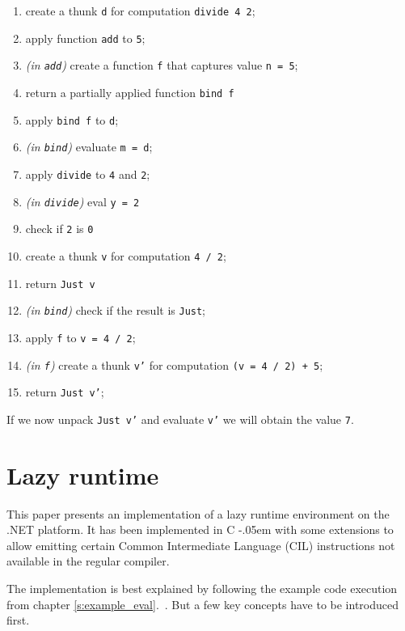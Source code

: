 \documentclass[en]{pracamgr}
\newcommand{\shrp}{%
  {\settoheight{\dimen0}{C}\kern-.05em \resizebox{!}{\dimen0}{\raisebox{\depth}{\textbf{\#}}}\hspace{1ex}}}
\newcommand{\myref}[1]{\ref{#1}.~\nameref{#1}}
\begin{document}
\begin{enumerate}
    \item create a thunk \texttt{d} for computation \texttt{divide 4 2};
    \item apply function \texttt{add} to \texttt{5};
    \item \textit{(in \texttt{add})} create a function \texttt{f} that captures value \texttt{n = 5};
    \item return a partially applied function \texttt{bind f}
    \item apply \texttt{bind f} to \texttt{d};
    \item \textit{(in \texttt{bind})} evaluate \texttt{m = d};
    \item apply \texttt{divide} to \texttt{4} and \texttt{2};
    \item \textit{(in \texttt{divide})} eval \texttt{y = 2}
    \item check if \texttt{2} is \texttt{0}
    \item create a thunk \texttt{v} for computation \texttt{4 / 2};
    \item return \texttt{Just v}
    \item \textit{(in \texttt{bind})} check if the result is \texttt{Just};
    \item apply \texttt{f} to \texttt{v = 4 / 2};
    \item \textit{(in \texttt{f})} create a thunk \texttt{v'} for computation \texttt{(v = 4 / 2) + 5};
    \item return \texttt{Just v'};
\end{enumerate}

If we now unpack \texttt{Just v'} and evaluate \texttt{v'} we will obtain the value \texttt{7}.


\chapter{Lazy runtime}\label{r:runtime}

This paper presents an implementation of a lazy runtime environment
on the .NET platform. It has been implemented in C\shrp with some
extensions to allow emitting certain Common Intermediate Language (CIL)
instructions not available in the regular compiler.

The implementation is best explained by following the example code execution from chapter \myref{s:example_eval}.
But a few key concepts have to be introduced first.
\end{document}
